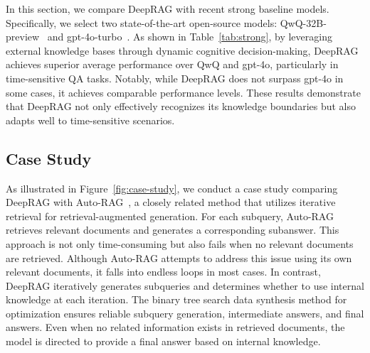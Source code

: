 In this section, we compare DeepRAG with recent strong baseline models. Specifically, we select two state-of-the-art open-source models: QwQ-32B-preview~\cite{qwq-32b-preview} and gpt-4o-turbo~\cite{OpenAI_hello_gpt4o}. 
% 
As shown in Table~\ref{tab:strong}, by leveraging external knowledge bases through dynamic cognitive decision-making, DeepRAG achieves superior average performance over QwQ and gpt-4o, particularly in time-sensitive QA tasks. 
% 
Notably, while DeepRAG does not surpass gpt-4o in some cases, it achieves comparable performance levels. 
% 
These results demonstrate that DeepRAG not only effectively recognizes its knowledge boundaries but also adapts well to time-sensitive scenarios.




\subsection{Case Study}

As illustrated in Figure~\ref{fig:case-study}, we conduct a case study comparing DeepRAG with Auto-RAG~\cite{yu2024autorag}, a closely related method that utilizes iterative retrieval for retrieval-augmented generation.
% 
For each subquery, Auto-RAG retrieves relevant documents and generates a corresponding subanswer. This approach is not only time-consuming but also fails when no relevant documents are retrieved.
Although Auto-RAG attempts to address this issue using its own relevant documents, it falls into endless loops in most cases.
% 
In contrast, DeepRAG iteratively generates subqueries and determines whether to use internal knowledge at each iteration. The binary tree search data synthesis method for optimization ensures reliable subquery generation, intermediate answers, and final answers. Even when no related information exists in retrieved documents, the model is directed to provide a final answer based on internal knowledge.



